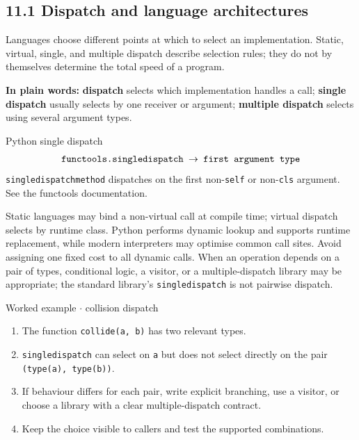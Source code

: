 \documentclass[11pt]{article}
\begin{document}
\begin{keepsection}
\section{11.1 Dispatch and language architectures}

Languages choose different points at which to select an implementation. Static, virtual, single, and multiple dispatch describe selection rules; they do not by themselves determine the total speed of a program.

\begin{plainbox}\textbf{In plain words:} \textbf{dispatch} selects which implementation handles a call; \textbf{single dispatch} usually selects by one receiver or argument; \textbf{multiple dispatch} selects using several argument types.\end{plainbox}

\begin{equationcard}{Python single dispatch}
\[ \begin{gathered} \texttt{functools.singledispatch \ensuremath{\to} first argument type} \end{gathered} \]
{\small \texttt{singledispatchmethod} dispatches on the first non-\texttt{self} or non-\texttt{cls} argument. See the functools documentation.}
\end{equationcard}

Static languages may bind a non-virtual call at compile time; virtual dispatch selects by runtime class. Python performs dynamic lookup and supports runtime replacement, while modern interpreters may optimise common call sites. Avoid assigning one fixed cost to all dynamic calls. When an operation depends on a pair of types, conditional logic, a visitor, or a multiple-dispatch library may be appropriate; the standard library’s \texttt{singledispatch} is not pairwise dispatch.

\begin{workedbox}{Worked example \ensuremath{\cdot} collision dispatch}
\begin{enumerate}
\item The function \texttt{collide(a, b)} has two relevant types.
\item \texttt{singledispatch} can select on \texttt{a} but does not select directly on the pair \texttt{(type(a), type(b))}.
\item If behaviour differs for each pair, write explicit branching, use a visitor, or choose a library with a clear multiple-dispatch contract.
\item Keep the choice visible to callers and test the supported combinations.
\end{enumerate}
\end{workedbox}


\end{keepsection}
\end{document}
